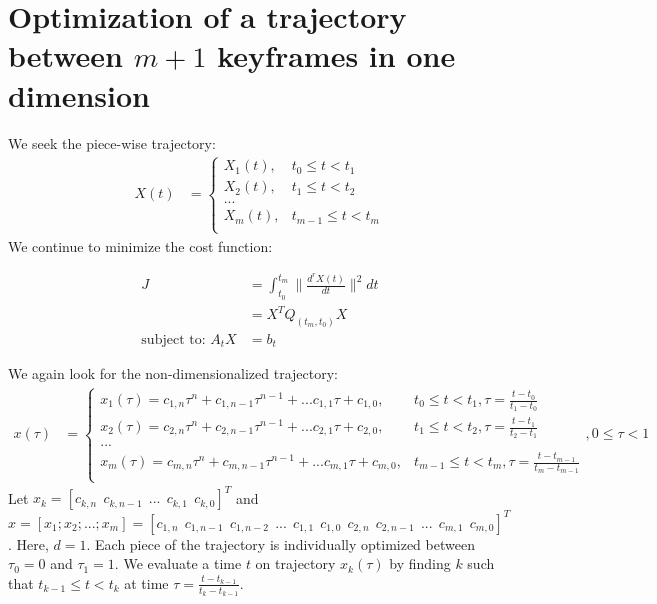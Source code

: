 \documentclass[11pt]{article}
\begin{document}
\newpage
\section{Optimization of a trajectory between $m+1$ keyframes in one dimension} \label{sec: mkeyframes1d}

\mbox{} \newline
We seek the piece-wise trajectory: 
\begin{align*}
X(t) &= 
\begin{cases}
    X_1 (t), & t_0 \le t < t_1 \\
    X_2 (t), & t_1 \le t < t_2 \\
    ... \\
    X_m (t), & t_{m-1} \le t < t_m \\
\end{cases}
\end{align*} 
We continue to minimize the cost function:

\begin{align*}
J &= \int_{t_0}^{t_m} \|  \frac{d^{r} X(t) }{dt} \|^2 dt \\
&= X^T Q_{(t_m, t_0)} X \\
\text{subject to: } A_t X &=b_t
\end{align*}

We again look for the non-dimensionalized trajectory: 
\begin{align*}
x(\tau) &= 
\begin{cases}
    x_1 (\tau) = c_{1, n} \tau^n + c_{1, n-1} \tau^{n-1} + ... c_{1, 1} \tau + c_{1, 0}, & t_0 \le t < t_1, \tau = \frac{t-t_0}{t_1-t_0}  \\
    x_2 (\tau) = c_{2, n} \tau^n + c_{2, n-1} \tau^{n-1} + ... c_{2, 1} \tau + c_{2, 0}, & t_1 \le t < t_2, \tau = \frac{t-t_1}{t_2-t_1}  \\
    ... \\
    x_m (\tau) = c_{m, n} \tau^n + c_{m, n-1} \tau^{n-1} + ... c_{m, 1} \tau + c_{m, 0}, & t_{m-1} \le t < t_m, \tau = \frac{t-t_{m-1}}{t_m-t_{m-1}} \\
\end{cases},  0 \le \tau < 1
\end{align*} 
Let $x_k = [c_{k, n} \ \ c_{k, n-1} \ \ ... \ \ c_{k, 1} \ \ c_{k, 0}]^T$ and $x = [x_1; x_2; ...; x_m] = [c_{1, n} \ \ c_{1, n-1} \ \ c_{1, n-2} \ \ ... \ \ c_{1, 1} \ \ c_{1, 0} \ \ c_{2, n} \ \ c_{2, n-1} \ \ ... \ \ c_{m, 1} \ \ c_{m, 0} ]^T$. Here, $d = 1$. Each piece of the trajectory is individually optimized between $\tau_0 = 0$ and $\tau_1=1$. We evaluate a time $t$ on trajectory $x_k(\tau)$ by finding $k$ such that $t_{k-1} \le t < t_k$ at time $\tau = \frac{t-t_{k-1}}{t_k-t_{k-1}}$.  
\end{document}
